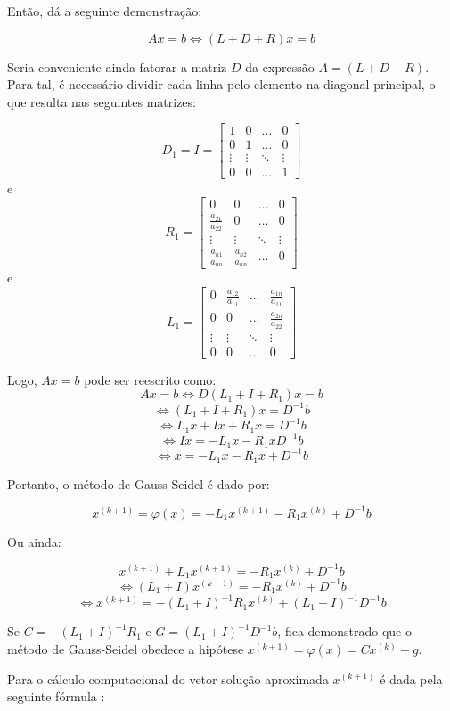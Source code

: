 \documentclass[twocolumn, 10pt]{extarticle}
\begin{document}
Então, \cite[p. 164]{ruggiero} dá a seguinte demonstração:

\[
Ax = b \iff (L + D + R)x = b
\]

Seria conveniente ainda fatorar a matriz $D$ da expressão $A = (L + D + R)$. Para tal, é necessário dividir cada linha pelo elemento na diagonal principal, o que resulta nas seguintes matrizes:

\[
D_1=I=
\begin{bmatrix}
1 & 0 & \dots & 0 \\
0 & 1 & \dots & 0 \\
\vdots & \vdots & \ddots & \vdots \\
0 & 0 & \dots & 1  
\end{bmatrix}
\]
e
\[
R_1 = 
\begin{bmatrix}
0 & 0 & \dots & 0 \\
\frac{a_{21}}{a_{22}} & 0 & \dots & 0 \\
\vdots & \vdots & \ddots & \vdots \\
\frac{a_{n1}}{a_{nn}} & \frac{a_{n2}}{a_{nn}} & \dots & 0  
\end{bmatrix}
\]
e
\[
L_1 = 
\begin{bmatrix}
0 & \frac{a_{12}}{a_{11}} & \dots & \frac{a_{1n}}{a_{11}} \\
0 & 0 & \dots & \frac{a_{2n}}{a_{22}}\\
\vdots & \vdots & \ddots & \vdots \\
0 & 0 & \dots & 0 
\end{bmatrix}
\]

Logo, $Ax = b$ pode ser reescrito como:
\[Ax = b \iff  D(L_1 + I + R_1)x = b\]
\[\iff  (L_1 + I + R_1)x = D^{-1}b\]
\[\iff  L_1x + Ix + R_1x = D^{-1}b\]
\[\iff  Ix = -L_1x - R_1x D^{-1}b\]
\[\iff  x = -L_1x - R_1x + D^{-1}b\]

Portanto, o método de Gauss-Seidel é dado por:

\[x^{(k+1)} = \varphi(x) = -L_1x^{(k+1)} - R_1x^{(k)} + D^{-1}b\]

Ou ainda:

\[x^{(k+1)} + L_1x^{(k+1)} = - R_1x^{(k)} + D^{-1}b\]
\[\iff (L_1 + I)x^{(k+1)} =- R_1x^{(k)} + D^{-1}b\]
\[\iff x^{(k+1)} =-(L_1 + I)^{-1}R_1x^{(k)} + (L_1 + I)^{-1}D^{-1}b\]

Se $C = -(L_1 + I)^{-1}R_1$ e $G = (L_1 + I)^{-1}D^{-1}b$, fica demonstrado que o método de Gauss-Seidel obedece a hipótese $x^{(k+1)} = \varphi(x) = Cx^{(k)}+g$.

Para o cálculo computacional do vetor solução aproximada $x^{(k+1)}$ é dada pela seguinte fórmula \cite[p. 513]{gene}:
\end{document}
